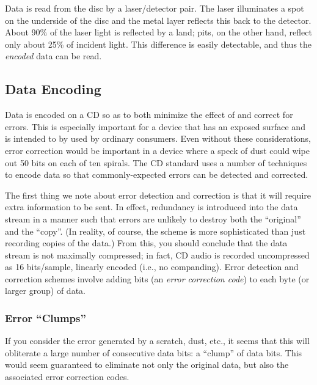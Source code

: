 Data is read from the disc by a laser/detector pair. The laser
illuminates a spot on the underside of the disc and the metal layer
reflects this back to the detector. About 90\% of the laser light is
reflected by a land; pits, on the other hand, reflect only about 25\%
of incident light. This difference is easily detectable, and thus the
\emph{encoded} data can be read.

\subsection{Data Encoding}

Data is encoded on a CD so as to both minimize the effect of and
correct for errors. This is especially important for a device that has
an exposed surface and is intended to by used by ordinary consumers.
Even without these considerations, error correction would be important
in a device where a speck of dust could wipe out 50 bits on each of
ten spirals. The CD standard uses a number of techniques to encode
data so that commonly-expected errors can be detected and corrected.

The first thing we note about error detection and correction is that
it will require extra information to be sent. In effect, redundancy is
introduced into the data stream in a manner such that errors are
unlikely to destroy both the ``original'' and the ``copy''. (In
reality, of course, the scheme is more sophisticated than just
recording copies of the data.) From this, you should conclude that the
data stream is not maximally compressed; in fact, CD audio is recorded
uncompressed as 16 bits/sample, linearly encoded (i.e., no
companding). Error detection and correction schemes involve adding
bits (an \emph{error correction code}) to each byte (or larger group)
of data.

\subsubsection{Error ``Clumps''}

If you consider the error generated by a scratch, dust, etc., it seems
that this will obliterate a large number of consecutive data bits: a
``clump'' of data bits.  This would seem guaranteed to eliminate not
only the original data, but also the associated error correction
codes.

